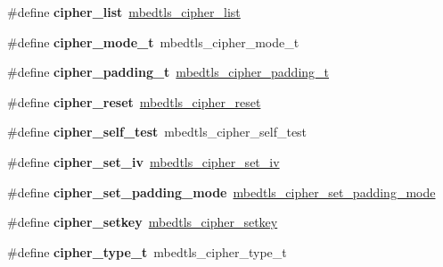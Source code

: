 \begin{DoxyCompactItemize}
\mbox{\label{compat-1_83_8h_af5815e9f4473026ffdd406c41157d275}} 
\#define {\bfseries cipher\+\_\+list}~\mbox{\hyperlink{cipher_8h_a763ea39a9ccfc20f914fd3391d12a7fc}{mbedtls\+\_\+cipher\+\_\+list}}
\item 
\mbox{\label{compat-1_83_8h_ad201970d4a274c39040af59987768c44}} 
\#define {\bfseries cipher\+\_\+mode\+\_\+t}~mbedtls\+\_\+cipher\+\_\+mode\+\_\+t
\item 
\mbox{\label{compat-1_83_8h_ad872910b03cb362f730b4c489d655799}} 
\#define {\bfseries cipher\+\_\+padding\+\_\+t}~\mbox{\hyperlink{cipher_8h_a5b57bc07ab7c430e9b4f29f3a5729837}{mbedtls\+\_\+cipher\+\_\+padding\+\_\+t}}
\item 
\mbox{\label{compat-1_83_8h_af796037a538548c7562a988dae2fe7e1}} 
\#define {\bfseries cipher\+\_\+reset}~\mbox{\hyperlink{cipher_8h_a22b60318022c1947d9893721bc911335}{mbedtls\+\_\+cipher\+\_\+reset}}
\item 
\mbox{\label{compat-1_83_8h_ae215456b4fe771365752326e57cda21c}} 
\#define {\bfseries cipher\+\_\+self\+\_\+test}~mbedtls\+\_\+cipher\+\_\+self\+\_\+test
\item 
\mbox{\label{compat-1_83_8h_a47bc21f801f5910673719b47de8bfafd}} 
\#define {\bfseries cipher\+\_\+set\+\_\+iv}~\mbox{\hyperlink{cipher_8h_a570ef5913117fbb2592f75d0d834b51c}{mbedtls\+\_\+cipher\+\_\+set\+\_\+iv}}
\item 
\mbox{\label{compat-1_83_8h_afbe158b83176eafb0ef2111467e4af07}} 
\#define {\bfseries cipher\+\_\+set\+\_\+padding\+\_\+mode}~\mbox{\hyperlink{cipher_8h_afad97d1964a7a98d82488fecd052130f}{mbedtls\+\_\+cipher\+\_\+set\+\_\+padding\+\_\+mode}}
\item 
\mbox{\label{compat-1_83_8h_a1ba5c9f98d32ca2e519c6231f3c3b6ea}} 
\#define {\bfseries cipher\+\_\+setkey}~\mbox{\hyperlink{cipher_8h_a027be8bf469069be17d82c4899b3df5f}{mbedtls\+\_\+cipher\+\_\+setkey}}
\item 
\mbox{\label{compat-1_83_8h_aaff6e258626937d7c055e3750feafa5d}} 
\#define {\bfseries cipher\+\_\+type\+\_\+t}~mbedtls\+\_\+cipher\+\_\+type\+\_\+t

\end{DoxyCompactItemize}
